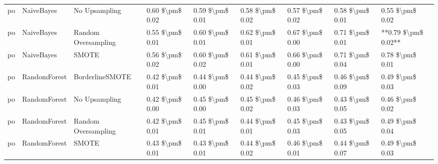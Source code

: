 \begin{tabular}{lllllllll}
      po &                      NaiveBayes &                 No Upsampling &     0.60 \$\textbackslash pm\$ 0.02 &           0.59 \$\textbackslash pm\$ 0.01 &       0.58 \$\textbackslash pm\$ 0.02 &        0.57 \$\textbackslash pm\$ 0.02 &                         0.58 \$\textbackslash pm\$ 0.01 &     0.55 \$\textbackslash pm\$ 0.02 \\
      po &                      NaiveBayes &           Random Oversampling &     0.55 \$\textbackslash pm\$ 0.01 &           0.60 \$\textbackslash pm\$ 0.01 &       0.62 \$\textbackslash pm\$ 0.01 &        0.67 \$\textbackslash pm\$ 0.00 &                         0.71 \$\textbackslash pm\$ 0.01 & **0.79 \$\textbackslash pm\$ 0.02** \\
      po &                      NaiveBayes &                         SMOTE &     0.56 \$\textbackslash pm\$ 0.02 &           0.60 \$\textbackslash pm\$ 0.02 &       0.61 \$\textbackslash pm\$ 0.01 &        0.66 \$\textbackslash pm\$ 0.00 &                         0.71 \$\textbackslash pm\$ 0.04 &     0.78 \$\textbackslash pm\$ 0.01 \\
      po &                    RandomForest &               BorderlineSMOTE &     0.42 \$\textbackslash pm\$ 0.01 &           0.44 \$\textbackslash pm\$ 0.00 &       0.44 \$\textbackslash pm\$ 0.02 &        0.45 \$\textbackslash pm\$ 0.03 &                         0.46 \$\textbackslash pm\$ 0.09 &     0.49 \$\textbackslash pm\$ 0.03 \\
      po &                    RandomForest &                 No Upsampling &     0.42 \$\textbackslash pm\$ 0.00 &           0.45 \$\textbackslash pm\$ 0.00 &       0.45 \$\textbackslash pm\$ 0.02 &        0.46 \$\textbackslash pm\$ 0.03 &                         0.43 \$\textbackslash pm\$ 0.05 &     0.46 \$\textbackslash pm\$ 0.02 \\
      po &                    RandomForest &           Random Oversampling &     0.42 \$\textbackslash pm\$ 0.01 &           0.45 \$\textbackslash pm\$ 0.01 &       0.44 \$\textbackslash pm\$ 0.01 &        0.45 \$\textbackslash pm\$ 0.03 &                         0.43 \$\textbackslash pm\$ 0.05 &     0.49 \$\textbackslash pm\$ 0.04 \\
      po &                    RandomForest &                         SMOTE &     0.43 \$\textbackslash pm\$ 0.01 &           0.43 \$\textbackslash pm\$ 0.01 &       0.44 \$\textbackslash pm\$ 0.02 &        0.46 \$\textbackslash pm\$ 0.01 &                         0.44 \$\textbackslash pm\$ 0.07 &     0.49 \$\textbackslash pm\$ 0.03 \\

\end{tabular}
